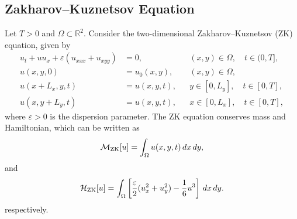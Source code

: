 \documentclass[11pt,a4paper]{article}
\theoremstyle{definition}
\theoremstyle{remark}
\numberwithin{equation}{section}
\numberwithin{figure}{section}
\numberwithin{table}{section}
\begin{document}


\subsection{Zakharov--Kuznetsov Equation}
\label{app:zk_line_soliton}
Let $T >0$ and $\Omega\subset\mathbb{R}^2$. Consider the two-dimensional Zakharov--Kuznetsov (ZK) equation, 
given by
\begin{equation}
\begin{aligned}
u_t + u u_x + \varepsilon\left(u_{xxx}+u_{xyy}\right) &= 0,
&& (x,y)\in\Omega,\quad t\in(0,T],\\
u(x,y,0) &= u_0(x,y),
&& (x,y)\in\Omega,\\
u(x+L_x,y,t) &= u(x,y,t),
&& y\in[0,L_y],\quad t\in[0,T],\\
u(x,y+L_y,t) &= u(x,y,t),
&& x\in[0,L_x],\quad t\in[0,T],
\end{aligned}
\label{eq:zk_equation_fno_style}
\end{equation}
where \(\varepsilon>0\) is the dispersion parameter. %
The ZK equation conserves mass and Hamiltonian, which can be written as 
\begin{equation}
    \mathcal M_{\rm ZK}[u]=\int_{\Omega}u(x,y,t)\,dx\,dy,
\end{equation}
and 
\begin{equation}
    \mathcal H_{\rm ZK}[u]
=
\int_{\Omega}
\left[
\frac{\varepsilon}{2}(u_x^2+u_y^2)-\frac16u^3
\right]\,dx\,dy.
\end{equation}
respectively.
\end{document}
